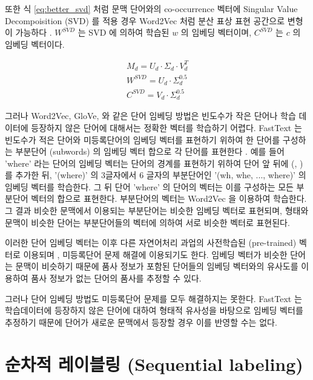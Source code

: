 \documentclass[oneside, ko,phd]{snuthesis_utf8_kor}
\begin{document}
또한 식 \ref{eq:better_svd} 처럼 문맥 단어와의 co-occurrence 벡터에 Singular Value Decompoisition (SVD) 를 적용 경우 Word2Vec 처럼 분산 표상 표현 공간으로 변형이 가능하다 \cite{levy2015improving}.
$W^{SVD}$ 는 SVD 에 의하여 학습된 $w$ 의 임베딩 벡터이며, $C^{SVD}$ 는 $c$ 의 임베딩 벡터이다.

\begin{equation}
  \label{eq:better_svd}
  \begin{aligned}
  M_d = U_d \cdot \Sigma_d \cdot V_d^T \\
  W^{SVD} = U_d \cdot \Sigma_d^{0.5} \\
  C^{SVD} = V_d \cdot \Sigma_d^{0.5}
  \end{aligned}
\end{equation}

그러나 Word2Vec, GloVe, \cite{levy2014neural} 와 같은 단어 임베딩 방법은 빈도수가 작은 단어나 학습 데이터에 등장하지 않은 단어에 대해서는 정확한 벡터를 학습하기 어렵다.
FastText 는 빈도수가 적은 단어와 미등록단어의 임베딩 벡터를 표현하기 위하여 한 단어를 구성하는 부분단어 (subwords) 의 임베딩 벡터 합으로 각 단어를 표현한다 \cite{bojanowski2017enriching}.
예를 들어 'where' 라는 단어의 임베딩 벡터는 단어의 경계를 표현하기 위하여 단어 앞 뒤에 (, ) 를 추가한 뒤, '(where)' 의 3글자에서 6 글자의 부분단어인 '(wh, whe, ..., where)' 의 임베딩 벡터를 학습한다.
그 뒤 단어 'where' 의 단어의 벡터는 이를 구성하는 모든 부분단어 벡터의 합으로 표현한다.
부분단어의 벡터는 Word2Vec 을 이용하여 학습한다.
그 결과 비슷한 문맥에서 이용되는 부분단어는 비슷한 임베딩 벡터로 표현되며, 형태와 문맥이 비슷한 단어는 부분단어들의 벡터에 의하여 서로 비슷한 벡터로 표현된다.

이러한 단어 임베딩 벡터는 이후 다른 자연어처리 과업의 사전학습된 (pre-trained) 벡터로 이용되며 \cite{kim2014convolutional}, 미등록단어 문제 해결에 이용되기도 한다.
임베딩 벡터가 비슷한 단어는 문맥이 비슷하기 때문에 품사 정보가 포함된 단어들의 임베딩 벡터와의 유사도를 이용하여 품사 정보가 없는 단어의 품사를 추정할 수 있다.

그러나 단어 임베딩 방법도 미등록단어 문제를 모두 해결하지는 못한다.
FastText 는 학습데이터에 등장하지 않은 단어에 대하여 형태적 유사성을 바탕으로 임베딩 벡터를 추정하기 때문에 단어가 새로운 문맥에서 등장할 경우 이를 반영할 수는 없다.

\section{순차적 레이블링 (Sequential labeling)}
\end{document}
